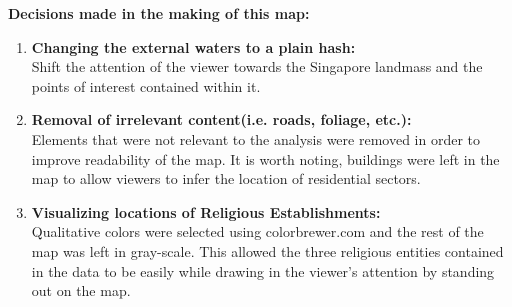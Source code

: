 \documentclass[a4paper, fleqn]{article}
\begin{document}
\textbf{Decisions made in the making of this map:}
\begin{enumerate}
\item \textbf{Changing the external waters to a plain hash:}\\
Shift the attention of the viewer towards the Singapore landmass and the points of interest contained within it.
\item \textbf{Removal of irrelevant content(i.e. roads, foliage, etc.):}\\
Elements that were not relevant to the analysis were removed in order to improve readability of the map. It is worth noting, buildings were left in the map to allow viewers to infer the location of residential sectors.
\item \textbf{Visualizing locations of Religious Establishments: }\\
Qualitative colors were selected using colorbrewer.com and the rest of the map was left in gray-scale. This allowed the three religious entities contained in the data to be easily while drawing in the viewer's attention by standing out on the map.
\end{enumerate}
\end{document}

